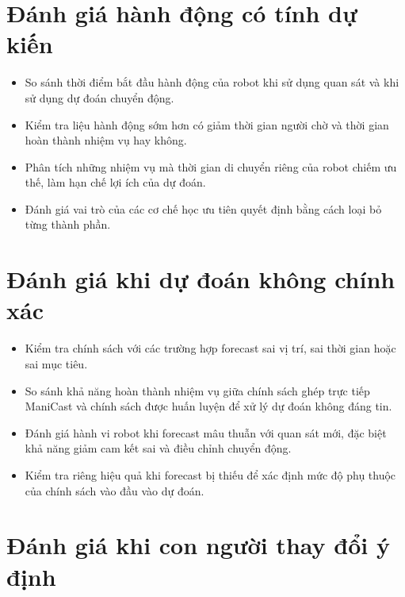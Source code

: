 \section{Đánh giá hành động có tính dự kiến}

\begin{itemize}
    \item So sánh thời điểm bắt đầu hành động của robot khi sử dụng quan sát và khi sử dụng dự đoán chuyển động.

    \item Kiểm tra liệu hành động sớm hơn có giảm thời gian người chờ và thời gian hoàn thành nhiệm vụ hay không.

    \item Phân tích những nhiệm vụ mà thời gian di chuyển riêng của robot chiếm ưu thế, làm hạn chế lợi ích của dự đoán.

    \item Đánh giá vai trò của các cơ chế học ưu tiên quyết định bằng cách loại bỏ từng thành phần.
\end{itemize}


\section{Đánh giá khi dự đoán không chính xác}

\begin{itemize}
    \item Kiểm tra chính sách với các trường hợp forecast sai vị trí, sai thời gian hoặc sai mục tiêu.

    \item So sánh khả năng hoàn thành nhiệm vụ giữa chính sách ghép trực tiếp ManiCast và chính sách được huấn luyện để xử lý dự đoán không đáng tin.

    \item Đánh giá hành vi robot khi forecast mâu thuẫn với quan sát mới, đặc biệt khả năng giảm cam kết sai và điều chỉnh chuyển động.

    \item Kiểm tra riêng hiệu quả khi forecast bị thiếu để xác định mức độ phụ thuộc của chính sách vào đầu vào dự đoán.
\end{itemize}


\section{Đánh giá khi con người thay đổi ý định}

